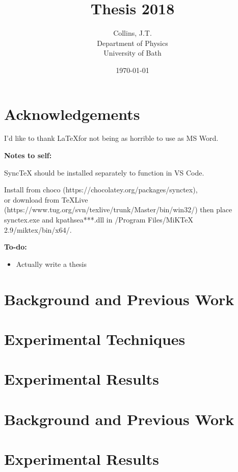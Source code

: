 \documentclass[11pt,a4paper,final]{report}
\title{Thesis 2018}
\author{
	Collins, J.T. \\ 
	Department of Physics\\
	University of Bath\\
}
\date{\today}
\begin{document}
\begin{titlepage}
    
\end{titlepage}

\clearpage
\tableofcontents
\clearpage

\begin{abstract}
    
\end{abstract}
\clearpage


\chapter*{Acknowledgements}
I'd like to thank \LaTeX  for not being as horrible to use as MS Word.

\noindent\textbf{Notes to self:}

\noindent SyncTeX should be installed separately to function in VS Code. 

\noindent Install from choco (https://chocolatey.org/packages/synctex), \\or download from TeXLive (https://www.tug.org/svn/texlive/trunk/Master/bin/win32/) then place synctex.exe and kpathsea***.dll in /Program Files/MiKTeX 2.9/miktex/bin/x64/.


\noindent\textbf{To-do:}
\begin{itemize}
    \item Actually write a thesis
\end{itemize}


\chapter{Background and Previous Work}\label{sec:background}



\chapter{Experimental Techniques}\label{sec:techniques}





\chapter{Experimental Results}\label{sec:results}








\clearpage

\appendix
\chapter{Background and Previous Work}\label{sec:appendix}
\chapter{Experimental Results}\label{sec:appendix}

\end{document}
